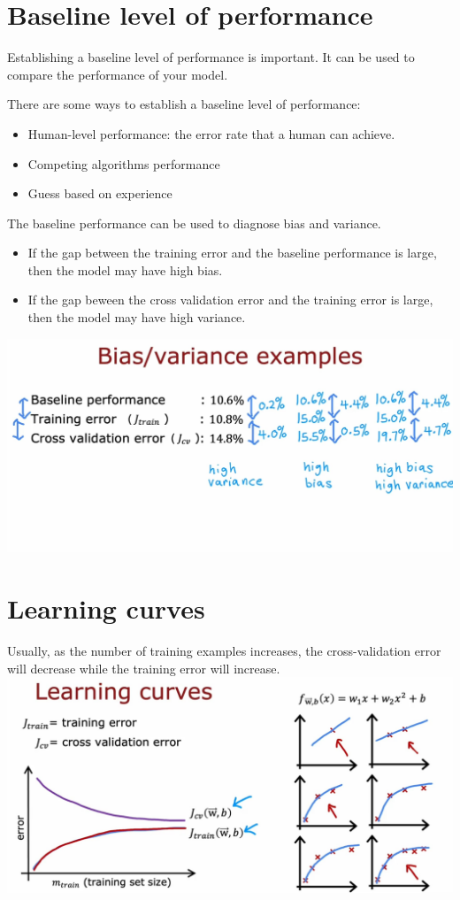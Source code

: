 \section{Baseline level of performance}
Establishing a baseline level of performance is important.
 It can be used to compare the performance of your model.\par
There are some ways to establish a baseline level of performance:
\begin{itemize}
    \item Human-level performance: the error rate that a human can achieve.
    \item Competing algorithms performance
    \item Guess based on experience
\end{itemize}
\par
The baseline performance can be used to diagnose bias and variance.
\begin{itemize}
    \item If the gap between the training error and the baseline performance is large,
    then the model may have high bias.
    \item If the gap beween the cross validation error and the training error is large,
    then the model may have high variance.
\end{itemize}
\includegraphics*[width=\textwidth]{images/10.12}
\section{Learning curves}
Usually, as the number of training examples increases, 
the cross-validation error will decrease while the training error will increase.
\\
\includegraphics*[width=\textwidth]{images/10.13}
